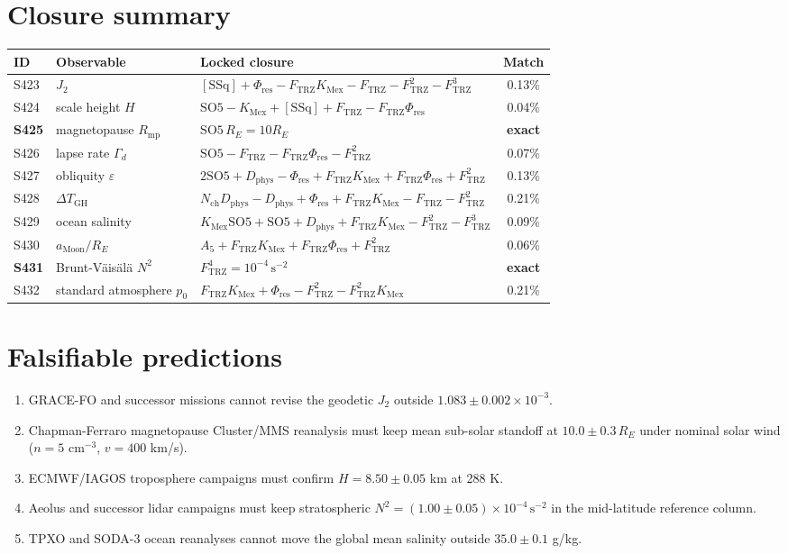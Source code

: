 \documentclass[11pt]{article}
\newcommand{\Ftrz}{F_{\mathrm{TRZ}}}
\newcommand{\Phires}{\Phi_{\mathrm{res}}}
\newcommand{\KMex}{K_{\mathrm{Mex}}}
\newcommand{\Dphys}{D_{\mathrm{phys}}}
\newcommand{\Nch}{N_{\mathrm{ch}}}
\newcommand{\SOfive}{\mathrm{SO5}}
\newcommand{\Afive}{A_{5}}
\newcommand{\SSq}{[\mathrm{SSq}]}
\begin{document}
\section{Closure summary}
\begin{table}[h!]
\centering
\begin{tabular}{lllc}
\toprule
ID & Observable & Locked closure & Match \\
\midrule
S423 & $J_{2}$                          & $\SSq+\Phires-\Ftrz\KMex-\Ftrz-\Ftrz^{2}-\Ftrz^{3}$ & 0.13\% \\
S424 & scale height $H$                  & $\SOfive-\KMex+\SSq+\Ftrz-\Ftrz\Phires$              & 0.04\% \\
\textbf{S425} & magnetopause $R_{\mathrm{mp}}$ & $\SOfive\,R_{E}=10R_{E}$                       & \textbf{exact} \\
S426 & lapse rate $\Gamma_{d}$           & $\SOfive-\Ftrz-\Ftrz\Phires-\Ftrz^{2}$               & 0.07\% \\
S427 & obliquity $\varepsilon$           & $2\SOfive+\Dphys-\Phires+\Ftrz\KMex+\Ftrz\Phires+\Ftrz^{2}$ & 0.13\% \\
S428 & $\Delta T_{\mathrm{GH}}$           & $\Nch\Dphys-\Dphys+\Phires+\Ftrz\KMex-\Ftrz-\Ftrz^{2}$ & 0.21\% \\
S429 & ocean salinity                    & $\KMex\SOfive+\SOfive+\Dphys+\Ftrz\KMex-\Ftrz^{2}-\Ftrz^{3}$ & 0.09\% \\
S430 & $a_{\mathrm{Moon}}/R_{E}$         & $\Afive+\Ftrz\KMex+\Ftrz\Phires+\Ftrz^{2}$           & 0.06\% \\
\textbf{S431} & Brunt-V\"ais\"al\"a $N^{2}$ & $\Ftrz^{4}=10^{-4}\,\mathrm{s}^{-2}$              & \textbf{exact} \\
S432 & standard atmosphere $p_{0}$       & $\Ftrz\KMex+\Phires-\Ftrz^{2}-\Ftrz^{2}\KMex$         & 0.21\% \\
\bottomrule
\end{tabular}
\end{table}

\section{Falsifiable predictions}
\begin{enumerate}[label=(F\arabic*)]
\item GRACE-FO and successor missions cannot revise the geodetic
$J_{2}$ outside $1.083\pm 0.002\times 10^{-3}$.
\item Chapman-Ferraro magnetopause Cluster/MMS reanalysis must keep
mean sub-solar standoff at $10.0\pm 0.3\,R_{E}$ under nominal solar
wind ($n=5$ cm$^{-3}$, $v=400$ km/s).
\item ECMWF/IAGOS troposphere campaigns must confirm $H=8.50\pm 0.05$ km at 288 K.
\item Aeolus and successor lidar campaigns must keep stratospheric
$N^{2}=(1.00\pm 0.05)\times 10^{-4}\,\mathrm{s}^{-2}$ in the mid-latitude reference column.
\item TPXO and SODA-3 ocean reanalyses cannot move the global mean
salinity outside $35.0\pm 0.1$ g/kg.
\end{enumerate}
\end{document}
